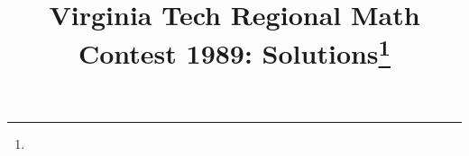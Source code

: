 \documentclass[10pt]{article}
\begin{document}
\title{Virginia Tech Regional Math Contest 1989: Solutions\footnote{\disclaimer}}
\author{\vspace{-2ex}}
\date{\vspace{-5ex}} %
\maketitle

%

%

%

%

%

%

%

%
\end{document}
